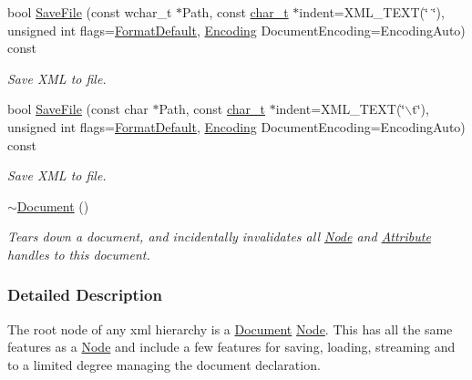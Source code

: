 \begin{DoxyCompactItemize}
bool \hyperlink{classphys_1_1xml_1_1Document_a39fd70a3f157cacc4a6e7bc6696750b9}{SaveFile} (const wchar\_\-t $\ast$Path, const \hyperlink{namespacephys_1_1xml_afc87705cd1c2917d87b879715a2d8f6e}{char\_\-t} $\ast$indent=XML\_\-TEXT(\char`\"{}	\char`\"{}), unsigned int flags=\hyperlink{namespacephys_1_1xml_a08bf6aab51f79929d9097706a5e64408}{FormatDefault}, \hyperlink{namespacephys_1_1xml_a420f5de782438f88160321385bea2015}{Encoding} DocumentEncoding=EncodingAuto) const 
\begin{DoxyCompactList}\small\item\em Save XML to file. \item\end{DoxyCompactList}\item 
bool \hyperlink{classphys_1_1xml_1_1Document_a67c47df1019344f2b62696e2d05e6555}{SaveFile} (const char $\ast$Path, const \hyperlink{namespacephys_1_1xml_afc87705cd1c2917d87b879715a2d8f6e}{char\_\-t} $\ast$indent=XML\_\-TEXT(\char`\"{}$\backslash$t\char`\"{}), unsigned int flags=\hyperlink{namespacephys_1_1xml_a08bf6aab51f79929d9097706a5e64408}{FormatDefault}, \hyperlink{namespacephys_1_1xml_a420f5de782438f88160321385bea2015}{Encoding} DocumentEncoding=EncodingAuto) const 
\begin{DoxyCompactList}\small\item\em Save XML to file. \item\end{DoxyCompactList}\item 
\hypertarget{classphys_1_1xml_1_1Document_a70013c2b670c4d4b5ee55d12e7c50be4}{
\hyperlink{classphys_1_1xml_1_1Document_a70013c2b670c4d4b5ee55d12e7c50be4}{$\sim$Document} ()}
\label{classphys_1_1xml_1_1Document_a70013c2b670c4d4b5ee55d12e7c50be4}

\begin{DoxyCompactList}\small\item\em Tears down a document, and incidentally invalidates all \hyperlink{classphys_1_1xml_1_1Node}{Node} and \hyperlink{classphys_1_1xml_1_1Attribute}{Attribute} handles to this document. \item\end{DoxyCompactList}\end{DoxyCompactItemize}


\subsubsection{Detailed Description}
The root node of any xml hierarchy is a \hyperlink{classphys_1_1xml_1_1Document}{Document} \hyperlink{classphys_1_1xml_1_1Node}{Node}. This has all the same features as a \hyperlink{classphys_1_1xml_1_1Node}{Node} and include a few features for saving, loading, streaming and to a limited degree managing the document declaration. 

